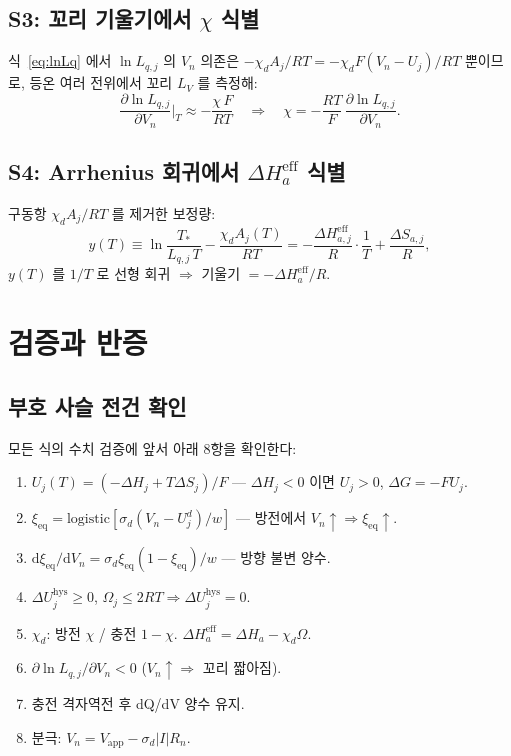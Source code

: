\documentclass[11pt,a4paper]{article}
\newcommand{\dd}{\mathrm{d}}
\newcommand{\app}{\mathrm{app}}
\newcommand{\eq}{\mathrm{eq}}
\newcommand{\eff}{\mathrm{eff}}
\newcommand{\hys}{\mathrm{hys}}
\begin{document}
\subsection{S3: 꼬리 기울기에서 $\chi$ 식별}

식~\eqref{eq:lnLq} 에서 $\ln L_{q,j}$ 의 $V_n$ 의존은 $-\chi_dA_j/RT = -\chi_d F(V_n-U_j)/RT$ 뿐이므로,
등온 여러 전위에서 꼬리 $L_V$ 를 측정해:
\begin{equation}
\frac{\partial\ln L_{q,j}}{\partial V_n}\bigg|_T \approx -\frac{\chi\,F}{RT}
\quad\Rightarrow\quad \chi = -\frac{RT}{F}\,\frac{\partial\ln L_{q,j}}{\partial V_n}.
\label{eq:S3chi}
\end{equation}

\subsection{S4: Arrhenius 회귀에서 $\Delta H_a^\eff$ 식별}

구동항 $\chi_dA_j/RT$ 를 제거한 보정량:
\begin{equation}
y(T) \equiv \ln\frac{T_*}{L_{q,j}\,T} - \frac{\chi_d A_j(T)}{RT}
= -\frac{\Delta H_{a,j}^\eff}{R}\cdot\frac{1}{T} + \frac{\Delta S_{a,j}}{R},
\label{eq:arrhenius}
\end{equation}
$y(T)$ 를 $1/T$ 로 선형 회귀 $\Rightarrow$ 기울기 $= -\Delta H_a^\eff/R$.

\section{검증과 반증}\label{sec:falsify}

\subsection{부호 사슬 전건 확인}

모든 식의 수치 검증에 앞서 아래 8항을 확인한다:
\begin{enumerate}[label=(\arabic*),leftmargin=2em,itemsep=1pt]
\item $U_j(T) = (-\Delta H_j + T\Delta S_j)/F$ — $\Delta H_j<0$ 이면 $U_j>0$, $\Delta G = -FU_j$.
\item $\xi_\eq = \mathrm{logistic}[\sigma_d(V_n-U_j^d)/w]$ — 방전에서 $V_n\uparrow\Rightarrow\xi_\eq\uparrow$.
\item $\dd\xi_\eq/\dd V_n = \sigma_d\xi_\eq(1-\xi_\eq)/w$ — 방향 불변 양수.
\item $\Delta U_j^\hys\ge0$, $\Omega_j\le2RT\Rightarrow\Delta U_j^\hys=0$.
\item $\chi_d$: 방전 $\chi$ / 충전 $1-\chi$. $\Delta H_a^\eff = \Delta H_a - \chi_d\Omega$.
\item $\partial\ln L_{q,j}/\partial V_n < 0$ ($V_n\uparrow\Rightarrow$ 꼬리 짧아짐).
\item 충전 격자역전 후 dQ/dV 양수 유지.
\item 분극: $V_n = V_\app - \sigma_d|I|R_n$.
\end{enumerate}
\end{document}
